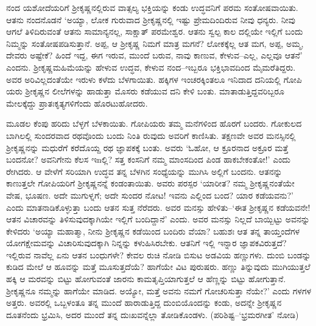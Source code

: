 ನಂದ ಯಶೋದೆಯರಿಗೆ ಶ್ರೀಕೃಷ್ಣನಲ್ಲಿರುವ ವಾತ್ಸಲ್ಯ ಭಕ್ತಿಯನ್ನು ಕಂಡು ಉದ್ಧವನಿಗೆ ಪರಮ ಸಂತೋಷವಾಯಿತು. ಆತನು ನಂದನೊಡನೆ ‘ಅಯ್ಯಾ, ಲೋಕ ಗುರುವಾದ ಶ್ರೀಕೃಷ್ಣನಲ್ಲಿ ಇಷ್ಟು ಪ್ರೇಮದಿಂದಿರುವ ನೀವು ಧನ್ಯರು. ನೀವು ಆಗಲೆ ತಿಳಿದಿರುವಂತೆ ಆತನು ಸಾಮಾನ್ಯನಲ್ಲ, ಸಾಕ್ಷಾತ್ ಪರಮೇಶ್ವರ. ಆತನು ಸ್ವಲ್ಪ ಕಾಲ ದಲ್ಲಿಯೇ ಇಲ್ಲಿಗೆ ಬಂದು ನಿಮ್ಮನ್ನು ಸಂತೋಷಪಡಿಸುತ್ತಾನೆ. ಅಪ್ಪ, ಆ ಶ್ರೀಕೃಷ್ಣ ನಿಮಗೆ ಮಾತ್ರ ಮಗನೆ? ಲೋಕಕ್ಕೆಲ್ಲ ಆತ ಮಗ, ಅಪ್ಪ, ಅಮ್ಮ, ದೇವರು ಅಷ್ಟೇಕೆ? ಹಿಂದೆ ಇದ್ದ, ಈಗ ಇರುವ, ಮುಂದೆ ಬರುವ, ನಾವು ಕಾಣುವ, ಕೇಳುವ–ಎಲ್ಲ, ಎಲ್ಲವೂ ಆತನೆ’ ಎಂದನು. ಶ್ರೀಕೃಷ್ಣಮಹಿಮೆಯನ್ನು ಹೇಳುವ ಉದ್ಧವ, ಕೇಳುವ ನಂದ–ಇಬ್ಬರೂ ಭಕ್ತಿಭಾವದಿಂದ ಮೈಮರೆತಿದ್ದರು. ಅವರ ಅರಿವಿಲ್ಲದಂತೆಯೇ ಇರುಳು ಕಳೆದು ಬೆಳಗಾಯಿತು. ಹಕ್ಕಿಗಳ ಇಂಚರಕ್ಕಿಂತಲೂ ಇನಿದಾದ ದನಿಯಲ್ಲಿ ಗೋಪಿ ಯರು ಶ್ರೀಕೃಷ್ಣನ ಲೀಲೆಗಳನ್ನು ಹಾಡುತ್ತಾ ಮೊಸರು ಕಡೆಯುವ ದನಿ ಕೇಳಿ ಬಂತು. ಮಾತಾಡುತ್ತಿದ್ದವರಿಬ್ಬರೂ ಮೇಲಕ್ಕೆದ್ದು ಪ್ರಾತಃಕೃತ್ಯಗಳಿಗೆಂದು ಹೊರಟುಹೋದರು.

ಮೂಡಲ ಕೆಂಪು ಹರಿದು ಬೆಳ್ಳಗೆ ಬೆಳಕಾಯಿತು. ಗೋಪಿಯರು ತಮ್ಮ ಮನೆಗಳಿಂದ ಹೊರಗೆ ಬಂದರು. ಗೋಕುಲದ ಬಾಗಿಲಲ್ಲಿ ಸುಂದರವಾದ ರಥವೊಂದು ಬಂದು ನಿಂತಿ ರುವುದು ಅವರಿಗೆ ಕಾಣಿಸಿತು. ತಕ್ಷಣವೇ ಅವರ ಮನಸ್ಸಿನಲ್ಲಿ ಶ್ರೀಕೃಷ್ಣನನ್ನು ಮಧುರೆಗೆ ಕರೆದೊಯ್ದ ರಥ ಜ್ಞಾಪಕಕ್ಕೆ ಬಂತು. ಅವರು ‘ಓಹೋ, ಆ ಕ್ರೂರನಾದ ಅಕ್ರೂರ ಮತ್ತೆ ಬಂದನೋ? ಅವನಿಗೇನು ಕೆಲಸ ಇnಲ್ಲಿ? ಸತ್ತ ಕಂಸನಿಗೆ ನಮ್ಮ ಮಾಂಸದಿಂದ ಪಿಂಡ ಹಾಕಬೇಕಂತೋ!’ ಎಂದು ರೇಗಿದರು. ಆ ವೇಳೆಗೆ ಸರಿಯಾಗಿ ಉದ್ಧವ ತನ್ನ ಬೆಳಗಿನ ಸಂಧ್ಯೆಯನ್ನು ಮುಗಿಸಿ ಅಲ್ಲಿಗೆ ಬಂದನು. ಆತನನ್ನು ಕಾಣುತ್ತಲೇ ಗೋಪಿಯರಿಗೆ ಶ್ರೀಕೃಷ್ಣನನ್ನೆ ಕಂಡಂತಾಯಿತು. ಅವರು ಪರಸ್ಪರ ‘ಯಾರೀತ? ನಮ್ಮ ಶ್ರೀಕೃಷ್ಣನಂತೆಯೇ ವೇಷ, ಭೂಷಣ. ಅದೇ ಮುಗುಳ್ನಗೆ; ಅದೇ ಸುಂದರ ನೋಟ! ಇವನು ಎಲ್ಲಿಂದ ಬಂದ? ಯಾರ ಕಡೆಯವನು?’ ಎಂದು ಮಾತನಾಡಿಕೊಳ್ಳುತ್ತಾ ಬಂದು ಆತನ ಸುತ್ತ ನೆರೆದರು. ಅವರ ಮನಸ್ಸು ಹೇಳಿತು–‘ಈತ ಶ್ರೀಕೃಷ್ಣನ ಕಡೆಯವನೇ! ಆತನ ವಿಚಾರವನ್ನು ತಿಳಿಸುವುದಕ್ಕಾಗಿಯೇ ಇಲ್ಲಿಗೆ ಬಂದಿದ್ದಾನೆ’ ಎಂದು. ಅವರ ಮನಸ್ಸು ನಿಲ್ಲದೆ ಬಾಯ್ಬಿಟ್ಟು ಅವನನ್ನು ಕೇಳಿದರು ‘ಅಯ್ಯಾ ಮಹಾತ್ಮಾ, ನೀನು ಶ್ರೀಕೃಷ್ಣನ ಕಡೆಯಿಂದ ಬಂದಿರು ವೆಯಾ? ಬಹುಶಃ ಆತ ತನ್ನ ತಾಯ್ತಂದೆಗಳ ಯೋಗಕ್ಷೇಮವನ್ನು ವಿಚಾರಿಸುವುದಕ್ಕಾಗಿ ನಿನ್ನನ್ನು ಕಳುಹಿಸಿರಬೇಕು. ಆತನಿಗೆ ಇಲ್ಲಿ ಇನ್ನಾರ ಜ್ಞಾಪಕವಿರುತ್ತದೆ? ಇಲ್ಲಿರುವ ನಾವೆಲ್ಲ ಏನು ಆತನ ಬಂಧುಗಳೇ? ಕೇವಲ ರುಚಿ ನೋಡಿ ಬಿಸುಟ ಅಡವಿಯ ಹಣ್ಣುಗಳು. ದುಂಬಿ ಬಂಡನ್ನು ಕುಡಿದ ಮೇಲೆ ಆ ಹೂವನ್ನು ಮತ್ತೆ ಮೂಸುತ್ತದೆಯೆ? ಹಾಗೆಯೇ ವಿಟ ಪುರುಷರು. ಹಣ್ಣು ತಿನ್ನುವುದು ಮುಗಿಯುತ್ತಲೆ ಹಕ್ಕಿ ಆ ಮರವನ್ನು ಬಿಟ್ಟು ಹೋಗುವಂತೆ ಜಾರನು ಕಾಮತೃಪ್ತಿಯಾಗುತ್ತಲೆ ಆ ಹೆಣ್ಣನ್ನು ಬಿಟ್ಟು ಹೋಗುತ್ತಾನೆ. ಶ್ರೀಕೃಷ್ಣನೂ ನಮ್ಮನ್ನು ಹಾಗೆಯೇ ಮಾಡಿದ. ಅಯ್ಯೋ, ಮತ್ತೆ ಅವನು ನಮಗೆ ಗೋಚರಿಸುತ್ತಾ ನೆಯೇ?’ ಎಂದು ಗಳಗಳ ಅತ್ತರು. ಅವರಲ್ಲಿ ಒಬ್ಬಳಂತೂ ತನ್ನ ಮುಂದೆ ಹಾರಾಡುತ್ತಿದ್ದ ದುಂಬಿಯೊಂದನ್ನು ಕಂಡು, ಅದನ್ನೇ ಶ್ರೀಕೃಷ್ಣನ ದೂತನೆಂದು ಭ್ರಮಿಸಿ, ಅದರ ಮುಂದೆ ತನ್ನ ದುಃಖವನ್ನೆಲ್ಲಾ ತೋಡಿಕೊಂಡಳು. (ಪರಿಶಿಷ್ಟ–‘ಭ್ರಮರಗೀತ’ ನೋಡಿ)


